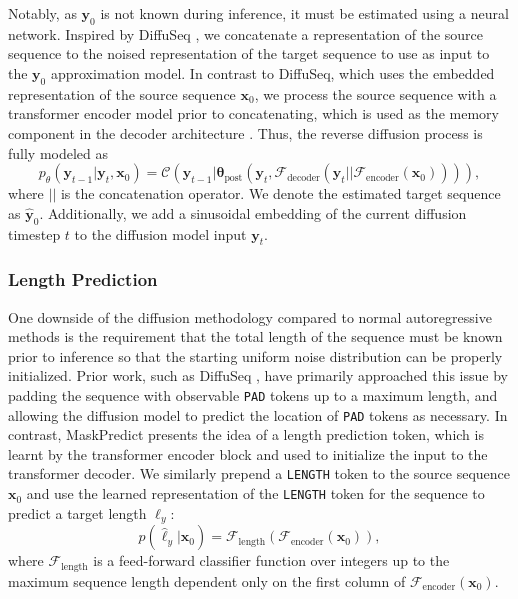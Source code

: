 \documentclass{article}
\begin{document}
Notably, as $\bm{y}_0$ is not known during inference, it must be estimated using a neural network. Inspired by DiffuSeq \cite{gong2022diffuseq, gong2023diffuseq}, we concatenate a representation of the source sequence to the noised representation of the target sequence to use as input to the $\bm{y}_0$ approximation model. In contrast to DiffuSeq, which uses the embedded representation of the source sequence $\bm{x}_0$, we process the source sequence with a transformer encoder model prior to concatenating, which is used as the memory component in the decoder architecture \cite{lewis2019bart}. Thus, the reverse diffusion process is fully modeled as
\begin{equation}
    p_{\theta}(\bm{y}_{t-1} | \bm{y}_t, \bm{x}_0) = \mathcal{C}(\bm{y}_{t-1} | \bm{\theta}_{\text{post}}(\bm{y}_t, \mathcal{F}_{\text{decoder}}(\bm{y}_t || \mathcal{F}_{\text{encoder}}(\bm{x}_0)))),
\end{equation}
where $||$ is the concatenation operator. We denote the estimated target sequence as $\hat{\bm{y}}_0$. Additionally, we add a sinusoidal embedding of the current diffusion timestep $t$ to the diffusion model input $\bm{y}_{t}$.

\subsubsection{Length Prediction}
\label{sec:length_prediction}

One downside of the diffusion methodology compared to normal autoregressive methods is the requirement that the total length of the sequence must be known prior to inference so that the starting uniform noise distribution can be properly initialized. Prior work, such as DiffuSeq \cite{gong2022diffuseq, gong2023diffuseq}, have primarily approached this issue by padding the sequence with observable \texttt{PAD} tokens up to a maximum length, and allowing the diffusion model to predict the location of \texttt{PAD} tokens as necessary. In contrast, MaskPredict \cite{ghazvininejad2019mask} presents the idea of a length prediction token, which is learnt by the transformer encoder block and used to initialize the input to the transformer decoder. We similarly prepend a \texttt{LENGTH} token to the source sequence $\bm{x}_0$ and use the learned representation of the \texttt{LENGTH} token for the sequence to predict a target length $\hat{\ell}_y$:
\begin{equation}
    p(\hat{\ell}_y|\bm{x}_0) = \mathcal{F}_{\text{length}}(\mathcal{F}_\text{encoder}(\bm{x}_0)),
\end{equation}
where $\mathcal{F}_{\text{length}}$ is a feed-forward classifier function over integers up to the maximum sequence length dependent only on the first column of $\mathcal{F}_\text{encoder}(\bm{x}_0)$.
\end{document}
